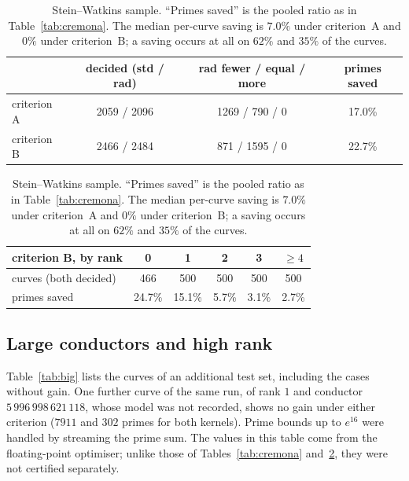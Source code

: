 \documentclass[11pt]{amsart}
\theoremstyle{remark}
\theoremstyle{definition}
\begin{document}
\begin{table}[h]
\centering\small
\begin{tabular}{lccc}
\toprule
 & decided (std / rad) & rad fewer / equal / more & primes saved\\
\midrule
criterion A & 2059 / 2096 & 1269 / \phantom{1}790 / 0 & 17.0\%\\
criterion B & 2466 / 2484 & \phantom{1}871 / 1595 / 0 & 22.7\%\\
\bottomrule
\end{tabular}

\smallskip
\begin{tabular}{lccccc}
\toprule
criterion B, by rank & 0 & 1 & 2 & 3 & $\ge4$\\
\midrule
curves (both decided) & 466 & 500 & 500 & 500 & 500\\
primes saved & 24.7\% & 15.1\% & 5.7\% & 3.1\% & 2.7\%\\
\bottomrule
\end{tabular}
\caption{Stein--Watkins sample. ``Primes saved'' is the pooled ratio as in
Table~\ref{tab:cremona}. The median per-curve saving is $7.0\%$ under criterion~A and $0\%$ under
criterion~B; a saving occurs at all on $62\%$ and $35\%$ of the curves.}
\label{tab:sw}
\end{table}

\subsection{Large conductors and high rank}
Table~\ref{tab:big} lists the curves of an additional test set, including the cases without gain. One further curve of the same run, of rank $1$ and conductor $5\,996\,998\,621\,118$, whose model was not recorded, shows no gain under either criterion ($7911$ and $302$ primes for both kernels). Prime bounds up to $e^{16}$ were handled by streaming the prime sum. The values in this table come from the floating-point optimiser; unlike those of Tables~\ref{tab:cremona} and~\ref{tab:sw}, they were not certified separately.
\end{document}
